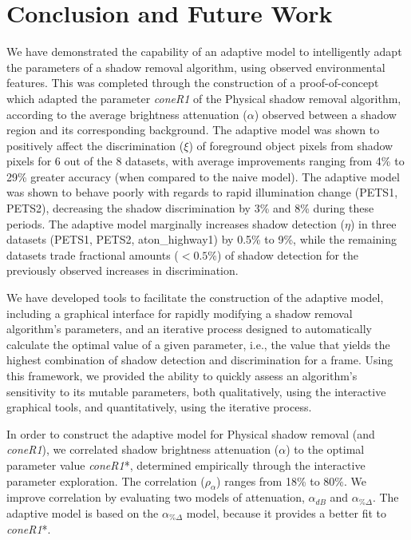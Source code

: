 \clearpage
\chapter{Conclusion and Future Work}

We have demonstrated the capability of an adaptive model to intelligently adapt the parameters of a shadow removal algorithm, using observed environmental features. This was completed through the construction of a proof-of-concept which adapted the parameter \textit{coneR1} of the Physical shadow removal algorithm, according to the average brightness attenuation ($\alpha$) observed between a shadow region and its corresponding background. The adaptive model was shown to positively affect the discrimination ($\xi$) of foreground object pixels from shadow pixels for 6 out of the 8 datasets, with average improvements ranging from 4\% to 29\% greater accuracy (when compared to the naive model). The adaptive model was shown to behave poorly with regards to rapid illumination change (PETS1, PETS2), decreasing the shadow discrimination by 3\% and 8\% during these periods. The adaptive model marginally increases shadow detection ($\eta$) in three datasets (PETS1, PETS2, aton\_highway1) by 0.5\% to 9\%, while the remaining datasets trade fractional amounts ($< 0.5\%$) of shadow detection for the previously observed increases in discrimination.

We have developed tools to facilitate the construction of the adaptive model, including a graphical interface for rapidly modifying a shadow removal algorithm's parameters, and an iterative process designed to automatically calculate the optimal value of a given parameter, i.e., the value that yields the highest combination of shadow detection and discrimination for a frame. Using this framework, we provided the ability to quickly assess an algorithm's sensitivity to its mutable parameters, both qualitatively, using the interactive graphical tools, and quantitatively, using the iterative process.

In order to construct the adaptive model for Physical shadow removal (and \textit{coneR1}), we correlated shadow brightness attenuation ($\alpha$) to the optimal parameter value \textit{coneR1}*, determined empirically through the interactive parameter exploration. The correlation ($\rho_{\alpha}$) ranges from 18\% to 80\%. We improve correlation by evaluating two models of attenuation, $\alpha_{dB}$ and $\alpha_{\%\Delta}$. The adaptive model is based on the $\alpha_{\%\Delta}$ model, because it provides a better fit to \textit{coneR1}*.

